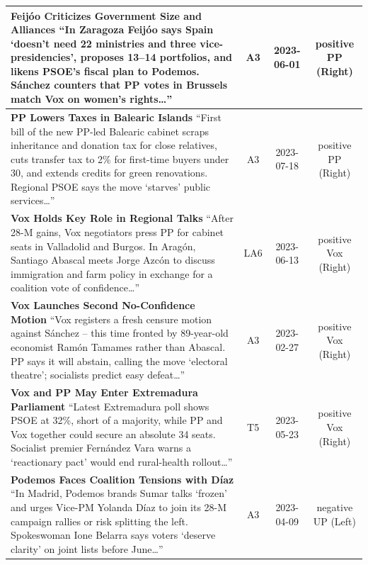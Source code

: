 \documentclass[12pt]{article}
\begin{document}
\begin{longtable}{|p{8cm}|c|c|c|}
	\hline
	\textbf{Feijóo Criticizes Government Size and Alliances}\newline
	{\scriptsize
		“In Zaragoza Feijóo says Spain ‘doesn’t need 22 ministries and three vice-presidencies’, proposes 13–14 portfolios, and likens PSOE’s fiscal plan to Podemos.  
		Sánchez counters that PP votes in Brussels match Vox on women’s rights…”}
	& A3 & 2023-06-01 & positive PP (Right)\\
	\hline
	\textbf{PP Lowers Taxes in Balearic Islands}\newline
	{\scriptsize
		“First bill of the new PP-led Balearic cabinet scraps inheritance and donation tax for close relatives, cuts transfer tax to 2\% for first-time buyers under 30, and extends credits for green renovations.  
		Regional PSOE says the move ‘starves’ public services…”}
	& A3 & 2023-07-18 & positive PP (Right)\\
	\hline
	\textbf{Vox Holds Key Role in Regional Talks}\newline
	{\scriptsize
		“After 28-M gains, Vox negotiators press PP for cabinet seats in Valladolid and Burgos.  
		In Aragón, Santiago Abascal meets Jorge Azcón to discuss immigration and farm policy in exchange for a coalition vote of confidence…”}
	& LA6 & 2023-06-13 & positive Vox (Right)\\
	\hline
	\textbf{Vox Launches Second No-Confidence Motion}\newline
	{\scriptsize
		“Vox registers a fresh censure motion against Sánchez – this time fronted by 89-year-old economist Ramón Tamames rather than Abascal.  
		PP says it will abstain, calling the move ‘electoral theatre’; socialists predict easy defeat…”}
	& A3 & 2023-02-27 & positive Vox (Right)\\
	\hline
	\textbf{Vox and PP May Enter Extremadura Parliament}\newline
	{\scriptsize
		“Latest Extremadura poll shows PSOE at 32\%, short of a majority, while PP and Vox together could secure an absolute 34 seats.  
		Socialist premier Fernández Vara warns a ‘reactionary pact’ would end rural-health rollout…”}
	& T5 & 2023-05-23 & positive Vox (Right)\\
	\hline
	\textbf{Podemos Faces Coalition Tensions with Díaz}\newline
	{\scriptsize
		“In Madrid, Podemos brands Sumar talks ‘frozen’ and urges Vice-PM Yolanda Díaz to join its 28-M campaign rallies or risk splitting the left.  
		Spokeswoman Ione Belarra says voters ‘deserve clarity’ on joint lists before June…”}
	& A3 & 2023-04-09 & negative UP (Left)\\

\end{longtable}
\end{document}
